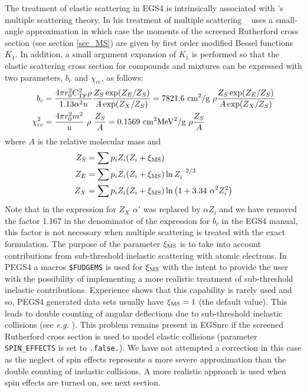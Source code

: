 The treatment of elastic scattering in EGS4 is intrinsically
associated with \Mol's multiple scattering theory\cite{Mo48}.
In his treatment of multiple scattering \Mol~ uses a small-angle
approximation in which case the moments of the screened Rutherford
cross section (see section \ref{sec_MS}) are given by
first order modified Bessel functions $K_1$.
In addition, a small argument expansion of $K_1$ is performed
so that the elastic scattering cross section for
compounds and mixtures can be expressed with two
parameters, $b_c$ and $\chi_{cc}$, as follows:
\begin{equation}
\begin{split}
b_c & =  {4 \pi r_0^2 C_{\rm TF}^2 \rho \over 1.13 \alpha^2 u}
{Z_S \exp(Z_E/Z_S) \over A \exp(Z_X/Z_S)} = 7821.6~ \mbox{cm}^2/\mbox{g}~\rho
{ Z_S \exp(Z_E/Z_S) \over A \exp(Z_X/Z_S)} \\
\chi_{cc}^2 & = {4 \pi r_0^2 m^2 \over u}~\rho~\frac{Z_S}{A} = 0.1569~
\mbox{cm}^2 \mbox{MeV}^2 / \mbox{g}~\rho \frac{Z_S}{A}
\end{split}
\end{equation}
where $A$ is the relative molecular mass and
\begin{equation}
\begin{split}
Z_S & = \sum p_i Z_i (Z_i + \xi_{\rm MS} ) \\
Z_E & = \sum p_i Z_i (Z_i + \xi_{\rm MS} ) \ln Z_i^{-2/3} \\
Z_X & = \sum p_i Z_i (Z_i + \xi_{\rm MS} ) \ln \left(1 + 3.34~ \alpha^2 Z_i^2
\right)
\end{split}
\end{equation}
Note that in the expression for $Z_X$ $\alpha'$ was replaced
by $\alpha Z_i$ and we have removed the factor 1.167 in the
denominator of the expression for $b_c$ in the EGS4 manual,
this factor is not necessary when multiple scattering is
treated with the exact formulation. The purpose of the
parameter $\xi_{\rm MS}$ is to take into account
contributions from sub-threshold inelastic scattering
with atomic electrons. In PEGS4 a macros {\tt \$FUDGEMS} is
used for $\xi_{\rm MS}$ with the intent to provide
the user with the possibility of implementing a more
realistic treatment of sub-threshold inelastic
contributions. Experience shows that
this capability is rarely used and so, PEGS4 generated
data sets usually have $\xi_{\rm MS}=1$ (the default value).
This leads to double counting of angular deflections due
to sub-threshold inelastic collisions (see {\em e.g.} \cite{LR94a}).
This problem remains present in EGSnrc if the screened
Rutherford cross section is used to model elastic collisions
(parameter {\tt SPIN\_EFFECTS} is set to {\tt .false.}).
We have not attempted a correction in this case as the neglect of spin
effects represents a more severe approximation than the
double counting of inelastic collisions. A more
realistic approach is used when spin effects are turned on,
see next section.

